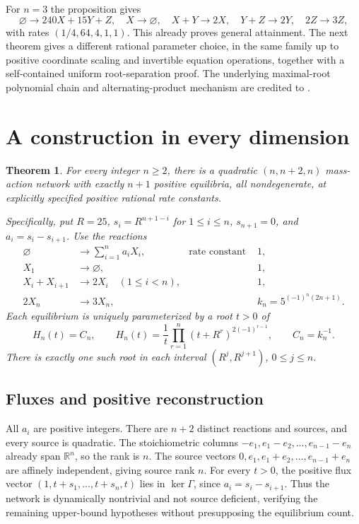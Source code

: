 \documentclass[11pt]{article}
\newtheorem{theorem}{Theorem}
\newcommand{\R}{\mathbb R}
\newcommand{\zero}{\varnothing}
\begin{document}
For $n=3$ the proposition gives
\[
\zero\to240X+15Y+Z,\quad X\to\zero,\quad X+Y\to2X,\quad
Y+Z\to2Y,\quad2Z\to3Z,
\]
with rates $(1/4,64,4,1,1)$. This already proves general attainment. The next theorem gives a different rational parameter choice, in the same family up to positive coordinate scaling and invertible equation operations, together with a self-contained uniform root-separation proof. The underlying maximal-root polynomial chain and alternating-product mechanism are credited to \cite{PR}.

\section{A construction in every dimension}
\begin{theorem}\label{thm:main}
For every integer $n\geq2$, there is a quadratic $(n,n+2,n)$ mass-action network with exactly $n+1$ positive equilibria, all nondegenerate, at explicitly specified positive rational rate constants.

Specifically, put $R=25$, $s_i=R^{n+1-i}$ for $1\leq i\leq n$, $s_{n+1}=0$, and $a_i=s_i-s_{i+1}$. Use the reactions
\begin{align}
\zero&\longrightarrow \sum_{i=1}^n a_iX_i, &\text{rate constant }&1,\label{eq:inflow}\\
X_1&\longrightarrow\zero, & &1,\nonumber\\
X_i+X_{i+1}&\longrightarrow 2X_i\quad(1\leq i<n), & &1,\nonumber\\
2X_n&\longrightarrow3X_n, &&k_n=5^{(-1)^n(2n+1)}.\label{eq:terminal}
\end{align}
Each equilibrium is uniquely parameterized by a root $t>0$ of
\begin{equation}\label{eq:master}
H_n(t)=C_n,\qquad
H_n(t)=\frac1t\prod_{r=1}^n(t+R^r)^{2(-1)^{r-1}},\qquad C_n=k_n^{-1}.
\end{equation}
There is exactly one such root in each interval $(R^j,R^{j+1})$, $0\leq j\leq n$.
\end{theorem}

\subsection{Fluxes and positive reconstruction}\label{sec:flux}
All $a_i$ are positive integers. There are $n+2$ distinct reactions and sources, and every source is quadratic. The stoichiometric columns $-e_1,e_1-e_2,\ldots,e_{n-1}-e_n$ already span $\R^n$, so the rank is $n$. The source vectors $0,e_1,e_1+e_2,\ldots,e_{n-1}+e_n$ are affinely independent, giving source rank $n$. For every $t>0$, the positive flux vector $(1,t+s_1,\ldots,t+s_n,t)$ lies in $\ker\Gamma$, since $a_i=s_i-s_{i+1}$. Thus the network is dynamically nontrivial and not source deficient, verifying the remaining upper-bound hypotheses without presupposing the equilibrium count.
\end{document}
